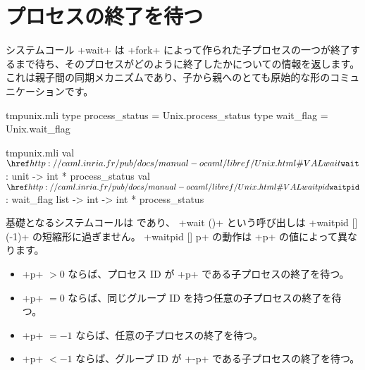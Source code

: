 \section{プロセスの終了を待つ}

システムコール \ml+wait+ は \ml+fork+ によって作られた子プロセスの一つが終了するまで待ち、そのプロセスがどのように終了したかについての情報を返します。これは親子間の同期メカニズムであり、子から親へのとても原始的な形のコミュニケーションです。
\label{wait}
%
\begin{codefile}{tmpunix.mli}
type process_status = Unix.process_status
type wait_flag = Unix.wait_flag
\end{codefile}
%
\begin{listingcodefile}{tmpunix.mli}
val $\indexlibvalue{Unix}{wait}$ : unit -> int * process_status
val $\libvalue{Unix}{waitpid}$ : wait_flag list -> int -> int * process_status
\end{listingcodefile}
%
基礎となるシステムコールは  であり、 \ml+wait ()+ という呼び出しは \ml+waitpid [] (-1)+ の短縮形に過ぎません。
%
\ml+waitpid [] p+ の動作は \ml+p+ の値によって異なります。
\begin{itemize}
  \item \ml+p+ $> 0$ ならば、プロセス ID が \ml+p+ である子プロセスの終了を待つ。
  \item \ml+p+ $= 0$ ならば、同じグループ ID を持つ任意の子プロセスの終了を待つ。
  \item \ml+p+ $= -1$ ならば、任意の子プロセスの終了を待つ。
  \item \ml+p+ $<-1$ ならば、グループ ID が \ml+-p+ である子プロセスの終了を待つ。
\end{itemize}
